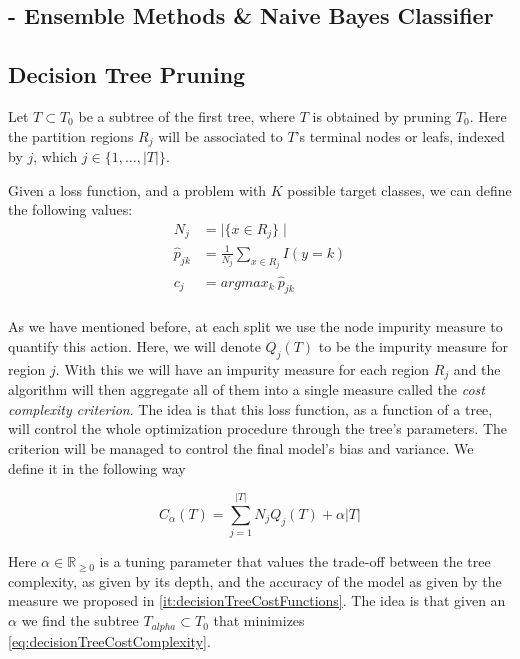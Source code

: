 \begin{appendices}
\chapter{- Ensemble Methods \& Naive Bayes Classifier}\label{appx:ensembleBayes}

\section{Decision Tree Pruning}\label{appx:sec:tree_pruning}

Let $T \subset T_0$ be a subtree of the first tree, where $T$ is obtained by pruning $T_0$. Here the partition regions $R_j$ will be associated to $T$'s terminal nodes or leafs, indexed by $j$, which $j \in \{1,\ldots,|T| \}$.

Given a loss function, and a problem with $K$ possible target classes, we can define the following values:
\begin{equation}
\begin{split}
N_j & = \mid \{x \in R_j \}\mid \\
\hat{p}_{jk} & = \frac{1}{N_j} \sum_{x \in R_j} I(y=k)\\
c_j & = argmax_{k} \ \hat{p}_{jk} \\
\end{split}
\end{equation}\label{eq:decisionTreePruneParameters}

As we have mentioned before, at each split we use the node impurity measure to quantify this action. Here, we will denote $Q_j(T)$ to be the impurity measure for region $j$.
With this we will have an impurity measure for each region $R_j$ and the algorithm will then aggregate all of them into a single measure called the \textit{cost complexity criterion}. The idea is that this loss function, as a function of a tree, will control the whole optimization procedure through the tree's parameters. The criterion will be managed to control the final model's bias and variance. We define it in the following way

\begin{equation}
C_\alpha(T) = \sum_{j=1}^{|T|} N_j Q_j(T) + \alpha|T|
\end{equation}\label{eq:decisionTreeCostComplexity}


Here $\alpha \in \mathbb{R}_{\geq 0}$ is a tuning parameter that values the trade-off between the tree complexity, as given by its depth, and the accuracy of the model as given by the measure we proposed in \cref{it:decisionTreeCostFunctions}. The idea is that given an $\alpha$ we find the subtree $T_{alpha} \subset T_0$ that minimizes \cref{eq:decisionTreeCostComplexity}.


\end{appendices}
